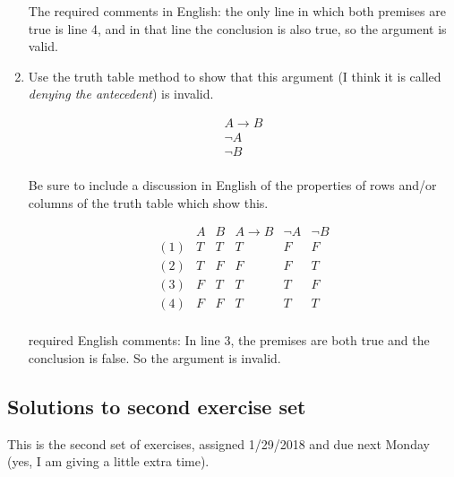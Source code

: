 \documentclass[12pt]{article}
\begin{document}
\begin{enumerate}
The required comments in English:  the only line in which both premises are true is line 4, and in that line the conclusion is also true, so the argument is valid.

\item Use the truth table method to show that this argument (I think it is called {\em denying the antecedent\/}) is invalid.

$$\begin{array}{c}

A \rightarrow B \\ 

\neg A \\ \hline

\neg B \\

\end{array}$$

Be sure to include a discussion in English of the properties of rows and/or columns of the truth table which show this.

$$\begin{array}{c|cc|cc|c}

 & A & B & A \rightarrow B & \neg A & \neg B\\ \hline
(1) & T & T & T & F & F \\
(2) & T & F & F & F & T \\
(3) & F & T & T & T & F \\
(4) & F & F & T & T & T \\

\end{array}$$

required English comments:  In line 3, the premises are both true and the conclusion is false.  So the argument is invalid.

\end{enumerate}



\subsection{Solutions to second exercise set}

This is the second set of exercises, assigned 1/29/2018 and due next Monday (yes, I am giving a little extra time).
\end{document}
